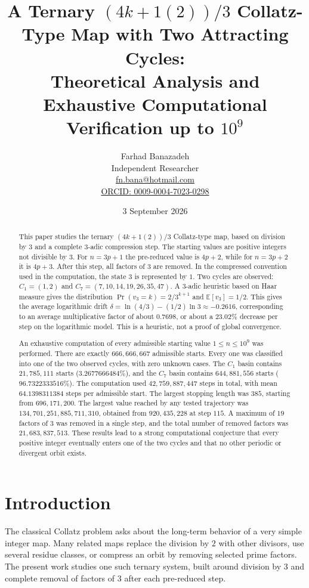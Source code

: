 \documentclass[11pt]{article}
\title{A Ternary $(4k+1(2))/3$ Collatz-Type Map with Two Attracting Cycles:\\
Theoretical Analysis and Exhaustive Computational Verification up to $10^9$}
\author{Farhad Banazadeh\\
Independent Researcher\\
\href{mailto:fn.bana@hotmail.com}{fn.bana@hotmail.com}\\
\href{https://orcid.org/0009-0004-7023-0298}{ORCID: 0009-0004-7023-0298}}
\date{3 September 2026}
\begin{document}
\maketitle

\begin{abstract}
This paper studies the ternary $(4k+1(2))/3$ Collatz-type map, based on division by $3$ and a complete $3$-adic compression step. The starting values are positive integers not divisible by $3$. For $n=3p+1$ the pre-reduced value is $4p+2$, while for $n=3p+2$ it is $4p+3$. After this step, all factors of $3$ are removed. In the compressed convention used in the computation, the state $3$ is represented by $1$. Two cycles are observed: $C_1=(1,2)$ and $C_7=(7,10,14,19,26,35,47)$. A $3$-adic heuristic based on Haar measure gives the distribution $\Pr(v_3=k)=2/3^{k+1}$ and $\mathbb{E}[v_3]=1/2$. This gives the average logarithmic drift
$\delta=\ln(4/3)-(1/2)\ln 3\approx-0.2616$, corresponding to an average multiplicative factor of about $0.7698$, or about a $23.02\%$ decrease per step on the logarithmic model. This is a heuristic, not a proof of global convergence.

An exhaustive computation of every admissible starting value $1\le n\le10^9$ was performed. There are exactly $666,666,667$ admissible starts. Every one was classified into one of the two observed cycles, with zero unknown cases. The $C_1$ basin contains $21,785,111$ starts ($3.2677666484\%$), and the $C_7$ basin contains $644,881,556$ starts ($96.7322333516\%$). The computation used $42,759,887,447$ steps in total, with mean $64.1398311384$ steps per admissible start. The largest stopping length was $385$, starting from $696,171,200$. The largest value reached by any tested trajectory was $134,701,251,885,711,310$, obtained from $920,435,228$ at step $115$. A maximum of $19$ factors of $3$ was removed in a single step, and the total number of removed factors was $21,683,837,513$. These results lead to a strong computational conjecture that every positive integer eventually enters one of the two cycles and that no other periodic or divergent orbit exists.
\end{abstract}

\section{Introduction}
The classical Collatz problem asks about the long-term behavior of a very simple integer map. Many related maps replace the division by $2$ with other divisors, use several residue classes, or compress an orbit by removing selected prime factors. The present work studies one such ternary system, built around division by $3$ and complete removal of factors of $3$ after each pre-reduced step.
\end{document}
